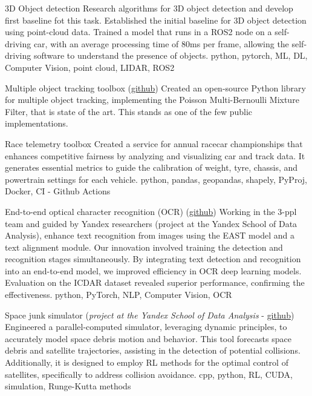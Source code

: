 \documentclass[]{resume}
\begin{document}
\project
{3D Object detection}
{Research algorithms for 3D object detection and develop first baseline fot this task.}
{Established the initial baseline for 3D object detection using point-cloud data. Trained a model that runs in a ROS2 node on a self-driving car, with an average processing time of 80ms per frame, allowing the self-driving software to understand the presence of objects.}
{python, pytorch, ML, DL, Computer Vision, point cloud, LIDAR, ROS2}

\par \noindent
{}
\project
{Multiple object tracking toolbox (\href{https://github.com/neer201/Multi-Object-Tracking-for-Automotive-Systems-in-python}{github})}
{Created an open-source Python library for multiple object tracking, implementing the Poisson Multi-Bernoulli Mixture Filter, that is state of the art. This stands as one of the few public implementations.}{}{}

\project
{Race telemetry toolbox}
{Created a service for annual racecar championships that enhances competitive fairness by analyzing and visualizing car and track data. It generates essential metrics to guide the calibration of weight, tyre, chassis, and powertrain settings for each vehicle.}
{}{python, pandas, geopandas, shapely, PyProj, Docker, CI - Github Actions}

\project
{End-to-end optical character recognition (OCR) (\href{https://github.com/neer201/end2end_OCR}{github})}
{Working in the 3-ppl team and guided by Yandex researchers (project at the Yandex School of Data Analysis), enhance text recognition from images using the EAST model and a text alignment module. Our innovation involved training the detection and recognition stages simultaneously.}
{By integrating text detection and recognition into an end-to-end model, we improved efficiency in OCR deep learning models. Evaluation on the ICDAR dataset revealed superior performance, confirming the effectiveness.}
{python, PyTorch, NLP, Computer Vision, OCR}

\project
{Space junk simulator (\textit{project at the Yandex School of Data Analysis} - \href{https://github.com/neer201/space_junk_simulator}{github})}
{}
{Engineered a parallel-computed simulator, leveraging dynamic principles, to accurately model space debris motion and behavior. This tool forecasts space debris and satellite trajectories, assisting in the detection of potential collisions. Additionally, it is designed to employ RL methods for the optimal control of satellites, specifically to address collision avoidance.}
{cpp, python, RL, CUDA, simulation, Runge-Kutta methods}
\end{document}

